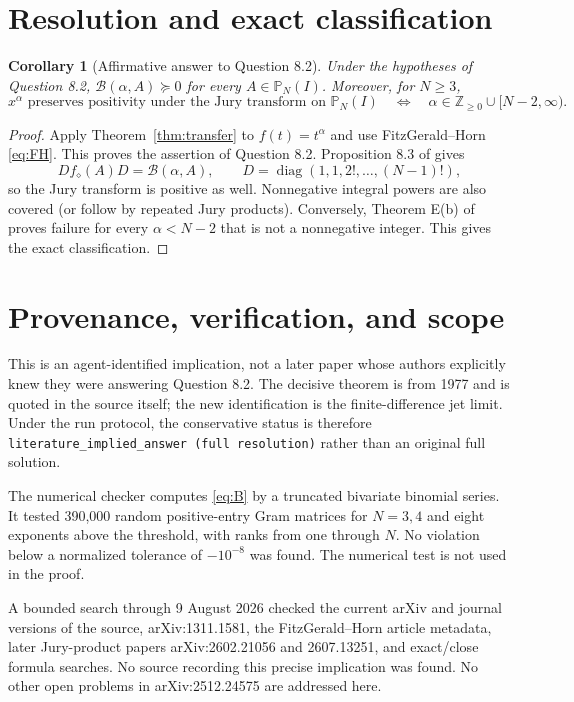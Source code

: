 \documentclass[11pt]{article}
\newtheorem{corollary}[theorem]{Corollary}
\begin{document}
\section{Resolution and exact classification}

\begin{corollary}[Affirmative answer to Question 8.2]\label{cor:answer}
Under the hypotheses of Question 8.2,
$\mathcal B(\alpha,A)\succeq0$ for every $A\in\mathbb P_N(I)$.
Moreover, for $N\ge3$,
\[
 x^\alpha\text{ preserves positivity under the Jury transform on }
 \mathbb P_N(I)
 \quad\Longleftrightarrow\quad
 \alpha\in\mathbb Z_{\ge0}\cup[N-2,\infty).
\]
\end{corollary}

\begin{proof}
Apply Theorem~\ref{thm:transfer} to $f(t)=t^\alpha$ and use
FitzGerald--Horn \eqref{eq:FH}. This proves the assertion of Question 8.2.
Proposition 8.3 of \cite{MNV} gives
\[
 D f_{\diamond}(A)D=\mathcal B(\alpha,A),
 \qquad D=\operatorname{diag}(1,1,2!,\ldots,(N-1)!),
\]
so the Jury transform is positive as well. Nonnegative integral powers are
also covered (or follow by repeated Jury products). Conversely, Theorem E(b)
of \cite{MNV} proves failure for every $\alpha<N-2$ that is not a
nonnegative integer. This gives the exact classification.
\end{proof}

\section{Provenance, verification, and scope}

This is an agent-identified implication, not a later paper whose authors
explicitly knew they were answering Question 8.2. The decisive theorem is
from 1977 and is quoted in the source itself; the new identification is the
finite-difference jet limit. Under the run protocol, the conservative status
is therefore \texttt{literature\_implied\_answer (full resolution)} rather
than an original full solution.

The numerical checker computes \eqref{eq:B} by a truncated bivariate binomial
series. It tested 390,000 random positive-entry Gram matrices for $N=3,4$ and
eight exponents above the threshold, with ranks from one through $N$. No
violation below a normalized tolerance of $-10^{-8}$ was found. The numerical
test is not used in the proof.

A bounded search through 9 August 2026 checked the current arXiv and journal
versions of the source, arXiv:1311.1581, the FitzGerald--Horn article metadata,
later Jury-product papers arXiv:2602.21056 and 2607.13251, and exact/close
formula searches. No source recording this precise implication was found.
No other open problems in arXiv:2512.24575 are addressed here.
\end{document}
